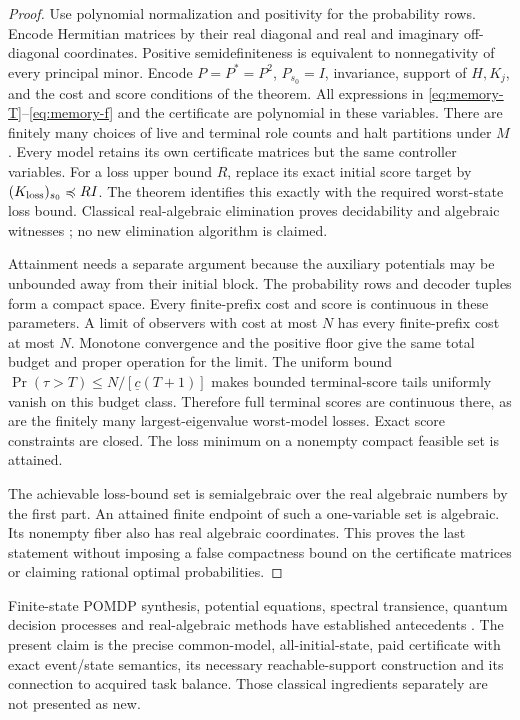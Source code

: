 \begin{proof}
Use polynomial normalization and positivity for the probability rows. Encode Hermitian matrices by their real diagonal and real and imaginary off-diagonal coordinates. Positive semidefiniteness is equivalent to nonnegativity of every principal minor. Encode $P=P^*=P^2$, $P_{s_0}=I$, invariance, support of $H,K_j$, and the cost and score conditions of the theorem. All expressions in \eqref{eq:memory-T}--\eqref{eq:memory-f} and the certificate are polynomial in these variables. There are finitely many choices of live and terminal role counts and halt partitions under $M$. Every model retains its own certificate matrices but the same controller variables. For a loss upper bound $R$, replace its exact initial score target by $(K_{\rm loss})_{s_0}\preccurlyeq RI$. The theorem identifies this exactly with the required worst-state loss bound. Classical real-algebraic elimination proves decidability and algebraic witnesses \cite{Seidenberg54}; no new elimination algorithm is claimed.

Attainment needs a separate argument because the auxiliary potentials may be unbounded away from their initial block. The probability rows and decoder tuples form a compact space. Every finite-prefix cost and score is continuous in these parameters. A limit of observers with cost at most $N$ has every finite-prefix cost at most $N$. Monotone convergence and the positive floor give the same total budget and proper operation for the limit. The uniform bound $\Pr(\tau>T)\le N/[\underline c(T+1)]$ makes bounded terminal-score tails uniformly vanish on this budget class. Therefore full terminal scores are continuous there, as are the finitely many largest-eigenvalue worst-model losses. Exact score constraints are closed. The loss minimum on a nonempty compact feasible set is attained.

The achievable loss-bound set is semialgebraic over the real algebraic numbers by the first part. An attained finite endpoint of such a one-variable set is algebraic. Its nonempty fiber also has real algebraic coordinates. This proves the last statement without imposing a false compactness bound on the certificate matrices or claiming rational optimal probabilities.
\end{proof}

Finite-state POMDP synthesis, potential equations, spectral transience, quantum decision processes and real-algebraic methods have established antecedents \cite{Chatterjee15,Andriushchenko23,Barry14,Ying18,Saldi25}. The present claim is the precise common-model, all-initial-state, paid certificate with exact event/state semantics, its necessary reachable-support construction and its connection to acquired task balance. Those classical ingredients separately are not presented as new.

